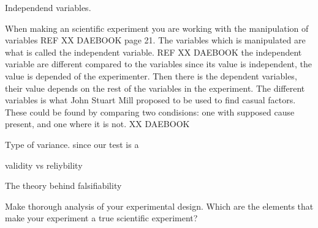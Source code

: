 Independend variables. 

When making an scientific experiment you are working with the manipulation of variables REF XX DAEBOOK page 21. The variables which is manipulated are what is called the independent variable. REF XX DAEBOOK the independent variable are different compared to the variables since its value is independent, the value is depended of the experimenter.
Then there is the dependent variables, their value depends on the rest of the variables in the experiment. The different variables is what John Stuart Mill proposed to be used to find casual factors. These could be found by comparing two condisions: one with supposed cause present, and one where it is not. XX DAEBOOK

Type of variance.
since our test is a 

validity vs reliybility

The theory behind falsifiability 


Make thorough analysis of your experimental design. Which are the elements that make your experiment a true scientific experiment?